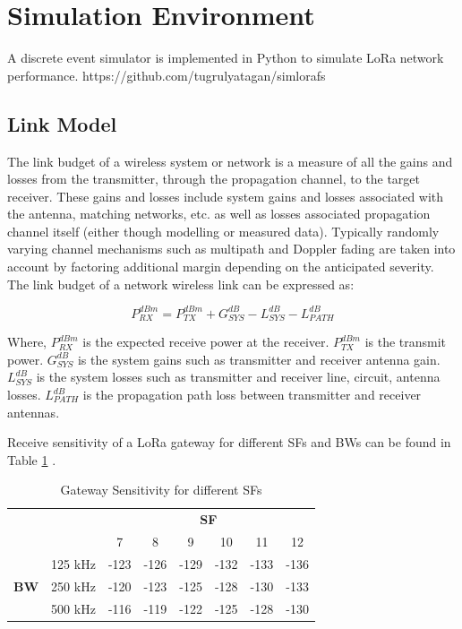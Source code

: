 \documentclass[conference]{IEEEtran}
\begin{document}
\section{Simulation Environment} \label{Simulation Environment}
\par [TODO] A discrete event simulator is implemented in Python to simulate LoRa network performance. https://github.com/tugrulyatagan/simlorafs

\subsection{Link Model}
\par [TODO] 


The link budget of a wireless system or network is a measure of all the gains and losses from the
transmitter, through the propagation channel, to the target receiver. These gains and losses include
system gains and losses associated with the antenna, matching networks, etc. as well as losses
associated propagation channel itself (either though modelling or measured data).
Typically randomly varying channel mechanisms such as multipath and Doppler fading are taken into
account by factoring additional margin depending on the anticipated severity.
The link budget of a network wireless link can be expressed as:

\begin{equation} \label{eq:rx_sensitivity}
P^{dBm}_{RX} = P^{dBm}_{TX} + G^{dB}_{SYS} - L^{dB}_{SYS} - L^{dB}_{PATH}
\end{equation}

Where, $P^{dBm}_{RX}$ is the expected receive power at the receiver. $P^{dBm}_{TX}$ is the transmit power. $G^{dB}_{SYS}$ is the system gains such as transmitter and receiver antenna gain. $L^{dB}_{SYS}$ is the system losses such as transmitter and receiver line, circuit, antenna losses. $L^{dB}_{PATH}$ is the propagation path loss between transmitter and receiver antennas.

\par Receive sensitivity of a LoRa gateway for different SFs and BWs can be found in Table \ref{table:gw_sf_sensitivity} \cite{SX1276}.

\begin{table}
\centering
\caption{Gateway Sensitivity for different SFs}
\label{table:gw_sf_sensitivity}
\begin{tabular}{|c|c|c|c|c|c|c|c|}
\hline
            &         & \multicolumn{6}{c|}{\textbf{SF}}        \\ \cline{3-8} 
            &         &    7 &    8 &    9 &   10 &   11 &   12 \\ \hline
            & 125 kHz & -123 & -126 & -129 & -132 & -133 & -136 \\ 
\textbf{BW} & 250 kHz & -120 & -123 & -125 & -128 & -130 & -133 \\
            & 500 kHz & -116 & -119 & -122 & -125 & -128 & -130 \\
\hline
\end{tabular}
\end{table}
\end{document}
